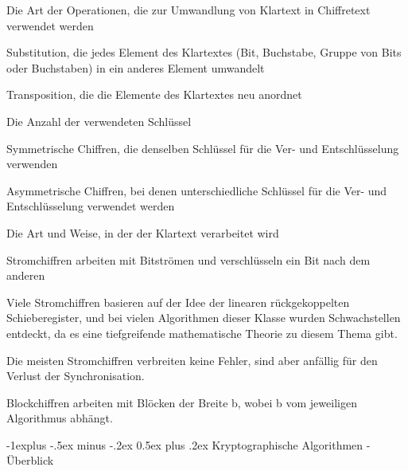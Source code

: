\documentclass[a4paper]{article}
\makeatletter
\renewcommand{\subsection}{\@startsection{subsection}{2}{0mm}%
 {-1explus -.5ex minus -.2ex}%
 {0.5ex plus .2ex}%
 {\normalfont\normalsize\bfseries}}
\makeatother
\begin{document}
\begin{multicols}{3}
      \begin{itemize*}
            \item Die Art der Operationen, die zur Umwandlung von Klartext in
            Chiffretext verwendet werden
            \begin{itemize*}
                  \item Substitution, die jedes Element des Klartextes (Bit, Buchstabe, Gruppe von Bits oder Buchstaben) in ein anderes Element umwandelt
                  \item Transposition, die die Elemente des Klartextes neu anordnet
            \end{itemize*}
            \item Die Anzahl der verwendeten Schlüssel
            \begin{itemize*}
                  \item Symmetrische Chiffren, die denselben Schlüssel für die Ver- und Entschlüsselung verwenden
                  \item Asymmetrische Chiffren, bei denen unterschiedliche Schlüssel für die Ver- und Entschlüsselung verwendet werden
            \end{itemize*}
            \item Die Art und Weise, in der der Klartext verarbeitet wird
            \begin{itemize*}
                  \item Stromchiffren arbeiten mit Bitströmen und verschlüsseln ein Bit nach dem anderen
                  \begin{itemize*} \item Viele Stromchiffren basieren auf der Idee der linearen rückgekoppelten Schieberegister, und bei vielen Algorithmen dieser Klasse wurden Schwachstellen entdeckt, da es eine tiefgreifende mathematische Theorie zu diesem Thema gibt. \item Die meisten Stromchiffren verbreiten keine Fehler, sind aber anfällig für den Verlust der Synchronisation. \end{itemize*}
                  \item Blockchiffren arbeiten mit Blöcken der Breite b, wobei b vom jeweiligen Algorithmus abhängt.
            \end{itemize*}
      \end{itemize*}


      \subsection{Kryptographische Algorithmen -
            Überblick}


\end{multicols}
\end{document}
